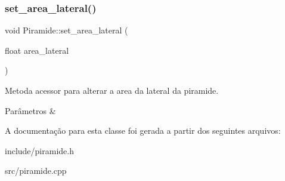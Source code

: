\subsubsection{\texorpdfstring{set\+\_\+area\+\_\+lateral()}{set\_area\_lateral()}}
{\footnotesize\ttfamily void Piramide\+::set\+\_\+area\+\_\+lateral (\begin{DoxyParamCaption}\item[{float}]{area\+\_\+lateral }\end{DoxyParamCaption})}



Metoda acessor para alterar a area da lateral da piramide. 


\begin{DoxyParams}{Parâmetros}
{\em } & \\
\hline
\end{DoxyParams}


A documentação para esta classe foi gerada a partir dos seguintes arquivos\+:\begin{DoxyCompactItemize}
\item 
include/piramide.\+h\item 
src/piramide.\+cpp\end{DoxyCompactItemize}
